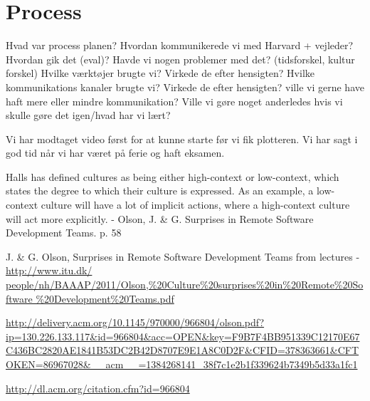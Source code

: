 
\section{Process}

Hvad var process planen?
Hvordan kommunikerede vi med Harvard + vejleder?
Hvordan gik det (eval)?
Havde vi nogen problemer med det? (tidsforskel, kultur forskel)
Hvilke værktøjer brugte vi?
Virkede de efter hensigten?
Hvilke kommunikations kanaler brugte vi?
Virkede de efter hensigten? ville vi gerne have haft mere eller mindre kommunikation?
Ville vi gøre noget anderledes hvis vi skulle gøre det igen/hvad har vi lært?

Vi har modtaget video først for at kunne starte før vi fik plotteren.
Vi har sagt i god tid når vi har været på ferie og haft eksamen.

Halls has defined cultures as being either high-context or low-context, which states the degree to which their culture is expressed. As an example, a low-context culture will have a lot of implicit actions, where a high-context culture will act more explicitly.
- Olson, J. \& G. Surprises in Remote Software Development Teams. p. 58

J. \& G. Olson, Surprises in Remote Software Development Teams from lectures - \url{http://www.itu.dk/ people/nh/BAAAP/2011/Olson,%20Culture%20surprises%20in%20Remote%20Software %20Development%20Teams.pdf}

\url{http://delivery.acm.org/10.1145/970000/966804/olson.pdf?ip=130.226.133.117&id=966804&acc=OPEN&key=F9B7F4BB951339C12170E67C436BC2820AE1841B53DC2B42D8707E9E1A8C0D2F&CFID=378363661&CFTOKEN=86967028&__acm__=1384268141_38f7c1e2b1f339624b7349b5d33a1fc1}

\url{http://dl.acm.org/citation.cfm?id=966804}
